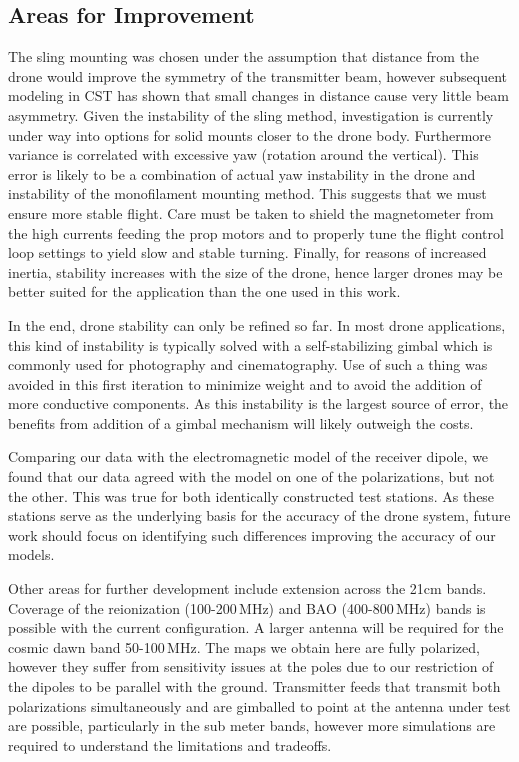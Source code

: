 \documentclass[preprint2,numberedappendix,tighten,twocolappendix]{aastex6}
\begin{document}
\subsection{Areas for Improvement}
The sling mounting was chosen under the assumption that distance from the drone would improve the symmetry of the transmitter beam, however subsequent modeling in CST has shown that small changes in distance cause very little beam asymmetry.  Given the instability of the sling method, investigation is currently under way into options for solid mounts closer to the drone body.  Furthermore variance is correlated with excessive yaw (rotation around the vertical). This error is likely to be a combination of actual yaw instability in the drone and instability of the monofilament mounting method. This suggests that we must ensure more stable flight. Care must be taken to shield the magnetometer from the high currents feeding the prop motors and to properly tune the flight control loop settings to yield slow and stable turning.   Finally, for reasons of increased inertia, stability increases with the size of the drone, hence larger drones may be better suited for the application than the one used in this work.

In the end, drone stability can only be refined so far. In most drone applications, this kind of instability is typically solved with a self-stabilizing gimbal which is commonly used for photography and cinematography. Use of such a thing was avoided in this first iteration to minimize weight and to avoid the addition of more conductive components. As this instability is the largest source of error, the benefits from addition of a gimbal mechanism will likely outweigh the costs. 

Comparing our data with the electromagnetic model of the receiver dipole, we found that our data agreed with the model on one of the polarizations, but not the other.  This was true for both identically constructed test stations. As these stations serve as the underlying basis for the accuracy of the drone system, future work should focus on identifying such differences improving the accuracy of our models.

Other areas for further development include extension across the 21cm bands. Coverage of the reionization (100-200\,MHz) and BAO (400-800\,MHz) bands is possible with the current configuration. A larger antenna will be required for the cosmic dawn band 50-100\,MHz.  The maps we obtain here are fully polarized, however they suffer from sensitivity issues at the poles due to our restriction of the dipoles to be parallel with the ground. Transmitter feeds that transmit both polarizations simultaneously and are gimballed to point at the antenna under test are possible, particularly in the sub meter bands, however more simulations are required to understand the limitations and tradeoffs.
\end{document}

